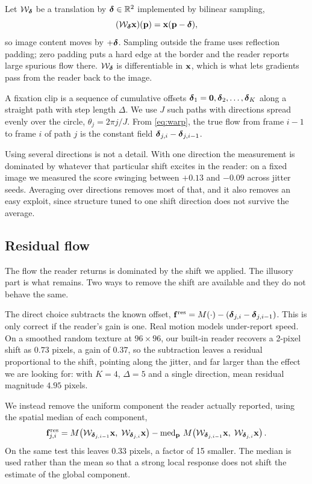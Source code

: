 Let $\mathcal{W}_{\boldsymbol{\delta}}$ be a translation by $\boldsymbol{\delta}\in\mathbb{R}^2$ implemented by bilinear
sampling,
\begin{equation}
(\mathcal{W}_{\boldsymbol{\delta}}\mathbf{x})(\mathbf{p})=\mathbf{x}(\mathbf{p}-\boldsymbol{\delta}),
\label{eq:warp}
\end{equation}
so image content moves by $+\boldsymbol{\delta}$. Sampling outside the frame uses reflection
padding; zero padding puts a hard edge at the border and the reader reports
large spurious flow there. $\mathcal{W}_{\boldsymbol{\delta}}$ is differentiable in $\mathbf{x}$, which is what
lets gradients pass from the reader back to the image.

A fixation clip is a sequence of cumulative offsets
$\boldsymbol{\delta}_1=\mathbf 0,\boldsymbol{\delta}_2,\dots,\boldsymbol{\delta}_K$ along a straight path with step length
$\Delta$. We use $J$ such paths with directions spread evenly over the circle,
$\theta_j=2\pi j/J$. From \eqref{eq:warp}, the true flow from frame $i-1$ to
frame $i$ of path $j$ is the constant field $\boldsymbol{\delta}_{j,i}-\boldsymbol{\delta}_{j,i-1}$.

Using several directions is not a detail. With one direction the measurement is
dominated by whatever that particular shift excites in the reader: on a fixed
image we measured the score swinging between $+0.13$ and $-0.09$ across jitter
seeds. Averaging over directions removes most of that, and it also removes an
easy exploit, since structure tuned to one shift direction does not survive the
average.

\subsection{Residual flow}
\label{sec:residual}

The flow the reader returns is dominated by the shift we applied. The illusory
part is what remains. Two ways to remove the shift are available and they do
not behave the same.

The direct choice subtracts the known offset,
$\mathbf{f}^{\text{res}}=M(\cdot)-(\boldsymbol{\delta}_{j,i}-\boldsymbol{\delta}_{j,i-1})$. This is only correct if
the reader's gain is one. Real motion models under-report speed. On a smoothed
random texture at $96\times96$, our built-in reader recovers a 2-pixel shift as
$0.73$ pixels, a gain of $0.37$, so the subtraction leaves a residual
proportional to the shift, pointing along the jitter, and far larger than the
effect we are looking for: with $K=4$, $\Delta=5$ and a single direction, mean
residual magnitude $4.95$ pixels.

We instead remove the uniform component the reader actually reported, using the
spatial median of each component,
\begin{equation}
\mathbf{f}^{\text{res}}_{j,i}
= M\!\left(\mathcal{W}_{\boldsymbol{\delta}_{j,i-1}}\mathbf{x},\; \mathcal{W}_{\boldsymbol{\delta}_{j,i}}\mathbf{x}\right)
- \operatorname{med}_{\mathbf{p}}\,
  M\!\left(\mathcal{W}_{\boldsymbol{\delta}_{j,i-1}}\mathbf{x},\; \mathcal{W}_{\boldsymbol{\delta}_{j,i}}\mathbf{x}\right).
\label{eq:residual}
\end{equation}
On the same test this leaves $0.33$ pixels, a factor of 15 smaller. The median
is used rather than the mean so that a strong local response does not shift the
estimate of the global component.

